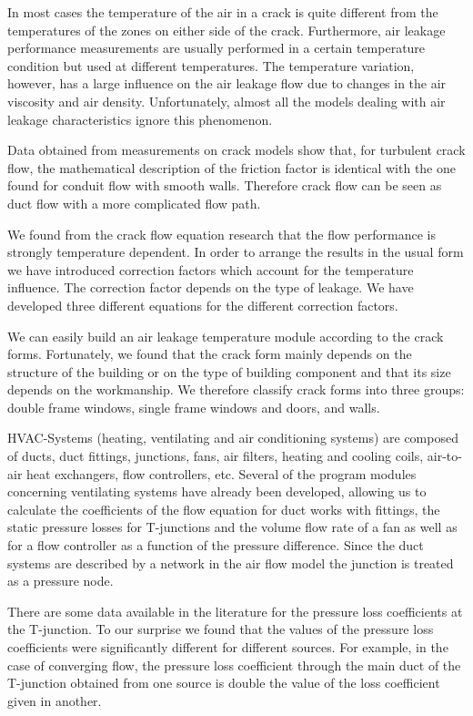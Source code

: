 \documentclass[10pt]{book}
\begin{document}
In most cases the temperature of the air in a crack is quite different from the temperatures of the zones on either side of the crack. Furthermore, air leakage performance measurements are usually performed in a certain temperature condition but used at different temperatures. The temperature variation, however, has a large influence on the air leakage flow due to changes in the air viscosity and air density. Unfortunately, almost all the models dealing with air leakage characteristics ignore this phenomenon.

Data obtained from measurements on crack models show that, for turbulent crack flow, the mathematical description of the friction factor is identical with the one found for conduit flow with smooth walls. Therefore crack flow can be seen as duct flow with a more complicated flow path.

We found from the crack flow equation research that the flow performance is strongly temperature dependent. In order to arrange the results in the usual form we have introduced correction factors which account for the temperature influence. The correction factor depends on the type of leakage. We have developed three different equations for the different correction factors.

We can easily build an air leakage temperature module according to the crack forms. Fortunately, we found that the crack form mainly depends on the structure of the building or on the type of building component and that its size depends on the workmanship. We therefore classify crack forms into three groups: double frame windows, single frame windows and doors, and walls. 

HVAC-Systems (heating, ventilating and air conditioning systems) are composed of ducts, duct fittings, junctions, fans, air filters, heating and cooling coils, air-to-air heat exchangers, flow controllers, etc. Several of the program modules concerning ventilating systems have already been developed, allowing us to calculate the coefficients of the flow equation for duct works with fittings, the static pressure losses for T-junctions and the volume flow rate of a fan as well as for a flow controller as a function of the pressure difference. Since the duct systems are described by a network in the air flow model the junction is treated as a pressure node.

There are some data available in the literature for the pressure loss coefficients at the T-junction. To our surprise we found that the values of the pressure loss coefficients were significantly different for different sources. For example, in the case of converging flow, the pressure loss coefficient through the main duct of the T-junction obtained from one source is double the value of the loss coefficient given in another.
\end{document}
